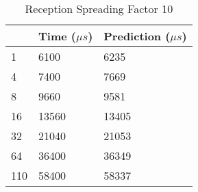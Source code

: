 \begin{table}[]
\centering
\begin{tabular}{|l|l|l|}
\hline
\rowcolor[HTML]{C0C0C0} 
\multicolumn{1}{|c|}{\cellcolor[HTML]{C0C0C0}Bytes} & Time ($\mu s$) & Prediction ($\mu s$) \\ \hline
1                                                   & 6100      & 6235       \\ \hline
4                                                   & 7400      & 7669       \\ \hline
8                                                   & 9660      & 9581       \\ \hline
16                                                  & 13560     & 13405      \\ \hline
32                                                  & 21040     & 21053      \\ \hline
64                                                  & 36400     & 36349      \\ \hline
110                                                 & 58400     & 58337      \\ \hline
\end{tabular}
\caption{Reception Spreading Factor 10\label{table:rxsf10}}
\end{table}
